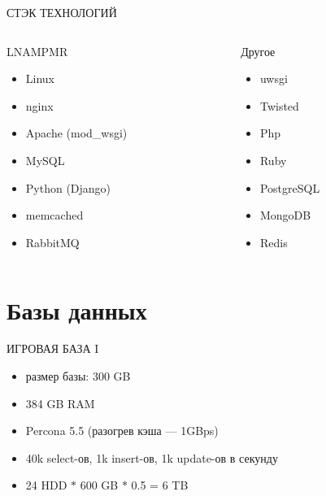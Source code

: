 \documentclass[aspectratio=169]{beamer}
\begin{document}
\begin{frame}{СТЭК ТЕХНОЛОГИЙ}
    \begin{columns}
        \begin{column}{0.4\textwidth}
            \begin{block}{LNAMPMR}
            \begin{itemize}
                \item Linux
                \item nginx
                \item Apache (mod\_wsgi)
                \item MySQL
                \item Python (Django)
                \item memcached
                \item RabbitMQ
            \end{itemize}
            \end{block}
        \end{column}

        \begin{column}{0.4\textwidth}
            \begin{block}{Другое}
            \begin{itemize}
                \item uwsgi
                \item Twisted
                \item Php
                \item Ruby
                \item PostgreSQL
                \item MongoDB
                \item Redis
            \end{itemize}
            \end{block}
        \end{column}
    \end{columns}
\end{frame}

\section{Базы данных}
\begin{frame}{ИГРОВАЯ БАЗА I}
    \begin{itemize}
        \item размер базы: 300 GB
        \item 384 GB RAM
        \item Percona 5.5 (разогрев кэша --- 1GBps)
        \item 40k select-ов, 1k insert-ов, 1k update-ов в секунду
        \item 24 HDD $*$ 600 GB $*$ 0.5 = 6 TB
    \end{itemize}
\end{frame}
\end{document}
